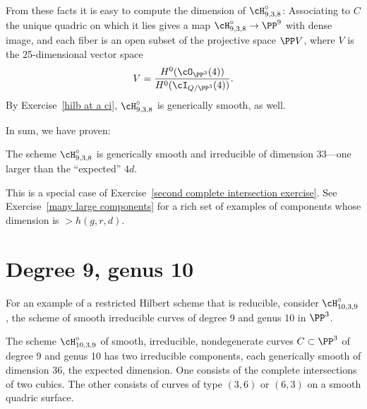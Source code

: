 From these facts it is easy to compute the dimension of  $\cH^\circ_{9,3,8}$: Associating to $C$ the unique quadric on which it lies gives a map $\cH^\circ_{9,3,8} \to \PP^9$ with dense image, and each fiber is an open subset of the projective space $\PP V$, where $V$ is the 25-dimensional vector space
$$
V = \frac{H^0(\cO_{\PP^3}(4))}{H^0(\cI_{Q/\PP^3}(4))}.
$$
By Exercise~\ref{hilb at a ci}, $\cH^\circ_{9,3,8}$ is generically smooth, as well.

In sum, we have proven:
\begin{proposition}
 The scheme $\cH^\circ_{9,3,8}$ is generically smooth and irreducible of dimension 33---one larger than the ``expected'' $4d$.
\end{proposition}
This is a special case of Exercise~\ref{second complete intersection exercise}.
See Exercise~\ref{many large components} for a rich set of examples of components whose dimension
is $>h(g,r,d)$.

\section{Degree 9, genus 10}\label{deg9 section}

For an example of a restricted Hilbert scheme that is reducible, consider $\cH^\circ_{10,3,9}$, the
scheme of smooth irreducible curves of degree 9 and genus 10 in $\PP^{3}$.

\begin{proposition}\label{types of 10,3,9}
 The scheme $\cH^\circ_{10,3,9}$ of smooth, irreducible, nondegenerate curves $C \subset \PP^3$ of degree 9 and genus 10 has two irreducible components, each generically smooth of dimension 36, the expected dimension. One consists of the complete intersections of two cubics. The other consists of curves of type $(3,6)$ or $(6,3)$ on a smooth quadric surface. \end{proposition}

